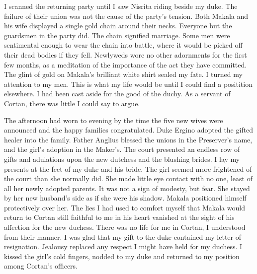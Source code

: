 \documentclass{article}
\begin{document}
I scanned the returning party until I saw Nisrita riding beside my duke. The failure of their union was not the cause of  the party's tension. Both Makala and his wife displayed a single gold chain around their necks. Everyone but the guardsmen in the party did. The chain signified marriage. Some men were sentimental enough to wear the chain into battle, where it would be picked off their dead bodies if they fell. Newlyweds wore no other adornments for the first few months, as a meditation of the importance of the act they have committed. The glint of gold on Makala's brilliant white shirt sealed my fate.
I turned my attention to my men. This is what my life would be until I could find a positition elsewhere. I had been cast aside for the good of the duchy. As a servant of Cortan, there was little I could say to argue. 

The afternoon had worn to evening by the time the five new wives were announced and the happy families congratulated. Duke Ergino adopted the gifted healer into the family. Father Anglius blessed the unions in the Preserver's name, and the girl's adoption in the Maker's. The court presented an endless row of gifts and adulations upon the new dutchess and the blushing brides. I lay my presents at the feet of my duke and his bride. The girl seemed more frightened of the court than she normally did. She made little eye contact with no one, least of all her newly adopted parents. It was not a sign of modesty, but fear. She stayed by her new husband's side as if she were his shadow. Makala positioned himself protectively over her. The lies I had used to comfort myself that Makala would return to Cortan still faithful to me in his heart vanished at the sight of his affection for the new duchess. There was no life for me in Cortan, I understood from their manner. I was glad that my gift to the duke contained my letter of resignation. Jealousy replaced any respect I might have held for my duchess. I kissed the girl's cold fingers, nodded to my duke and returned to my position among Cortan's officers.
\end{document}
